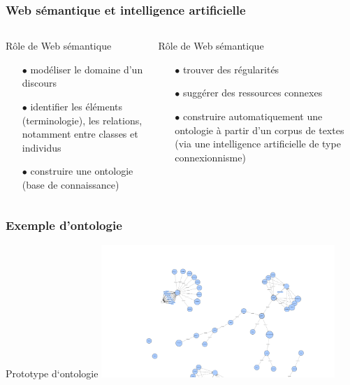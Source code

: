 \documentclass[xcolor=dvipsnames]{beamer}
\begin{document}
\begin{frame}[fragile]
\frametitle{Web sémantique et intelligence artificielle}
\begin{columns}
	\begin{block}{Rôle de Web sémantique}
		\begin{itemize}
			\item[$\bullet$] modéliser le domaine d'un discours
			\item[$\bullet$] identifier les éléments (terminologie), les relations, notamment entre classes et individus
			\item[$\bullet$] construire une ontologie (base de connaissance)
		\end{itemize}
	\end{block}
	\begin{block}{Rôle de Web sémantique}
		\begin{itemize}
			\item[$\bullet$] trouver des régularités
			\item[$\bullet$]suggérer des ressources connexes
			\item[$\bullet$] construire automatiquement une ontologie à partir d'un corpus de textes (via une intelligence artificielle de type connexionnisme)
		\end{itemize}
	\end{block}
\end{columns}
\end{frame}

\begin{frame}[fragile]
\frametitle{Exemple d’ontologie}
\begin{block}{Prototype d‘ontologie}
	\includegraphics[height = 5cm]{images/Ontologie_1.png}
\end{block}
\end{frame}
\end{document}
